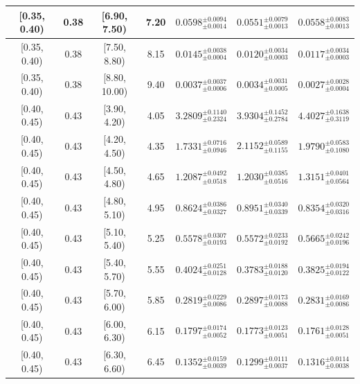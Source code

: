 \begin{longtable}{|c|c|c|c|c|c|c|}
\hline
[0.35, 0.40) & 0.38 & [6.90, 7.50) & 7.20 & $0.0598^{ \pm 0.0094 }_{ \pm 0.0014 }$ & $0.0551^{ \pm 0.0079 }_{ \pm 0.0013 }$ & $0.0558^{ \pm 0.0083 }_{ \pm 0.0013 }$ \\ 
\hline
[0.35, 0.40) & 0.38 & [7.50, 8.80) & 8.15 & $0.0145^{ \pm 0.0038 }_{ \pm 0.0004 }$ & $0.0120^{ \pm 0.0034 }_{ \pm 0.0003 }$ & $0.0117^{ \pm 0.0034 }_{ \pm 0.0003 }$ \\ 
\hline
[0.35, 0.40) & 0.38 & [8.80, 10.00) & 9.40 & $0.0037^{ \pm 0.0037 }_{ \pm 0.0006 }$ & $0.0034^{ \pm 0.0031 }_{ \pm 0.0005 }$ & $0.0027^{ \pm 0.0028 }_{ \pm 0.0004 }$ \\ 
\hline
[0.40, 0.45) & 0.43 & [3.90, 4.20) & 4.05 & $3.2809^{ \pm 0.1140 }_{ \pm 0.2324 }$ & $3.9304^{ \pm 0.1452 }_{ \pm 0.2784 }$ & $4.4027^{ \pm 0.1638 }_{ \pm 0.3119 }$ \\ 
\hline
[0.40, 0.45) & 0.43 & [4.20, 4.50) & 4.35 & $1.7331^{ \pm 0.0716 }_{ \pm 0.0946 }$ & $2.1152^{ \pm 0.0589 }_{ \pm 0.1155 }$ & $1.9790^{ \pm 0.0583 }_{ \pm 0.1080 }$ \\ 
\hline
[0.40, 0.45) & 0.43 & [4.50, 4.80) & 4.65 & $1.2087^{ \pm 0.0492 }_{ \pm 0.0518 }$ & $1.2030^{ \pm 0.0385 }_{ \pm 0.0516 }$ & $1.3151^{ \pm 0.0401 }_{ \pm 0.0564 }$ \\ 
\hline
[0.40, 0.45) & 0.43 & [4.80, 5.10) & 4.95 & $0.8624^{ \pm 0.0386 }_{ \pm 0.0327 }$ & $0.8951^{ \pm 0.0340 }_{ \pm 0.0339 }$ & $0.8354^{ \pm 0.0320 }_{ \pm 0.0316 }$ \\ 
\hline
[0.40, 0.45) & 0.43 & [5.10, 5.40) & 5.25 & $0.5578^{ \pm 0.0307 }_{ \pm 0.0193 }$ & $0.5572^{ \pm 0.0233 }_{ \pm 0.0192 }$ & $0.5665^{ \pm 0.0242 }_{ \pm 0.0196 }$ \\ 
\hline
[0.40, 0.45) & 0.43 & [5.40, 5.70) & 5.55 & $0.4024^{ \pm 0.0251 }_{ \pm 0.0128 }$ & $0.3783^{ \pm 0.0188 }_{ \pm 0.0120 }$ & $0.3825^{ \pm 0.0194 }_{ \pm 0.0122 }$ \\ 
\hline
[0.40, 0.45) & 0.43 & [5.70, 6.00) & 5.85 & $0.2819^{ \pm 0.0229 }_{ \pm 0.0086 }$ & $0.2897^{ \pm 0.0173 }_{ \pm 0.0088 }$ & $0.2831^{ \pm 0.0169 }_{ \pm 0.0086 }$ \\ 
\hline
[0.40, 0.45) & 0.43 & [6.00, 6.30) & 6.15 & $0.1797^{ \pm 0.0174 }_{ \pm 0.0052 }$ & $0.1773^{ \pm 0.0123 }_{ \pm 0.0051 }$ & $0.1761^{ \pm 0.0128 }_{ \pm 0.0051 }$ \\ 
\hline
[0.40, 0.45) & 0.43 & [6.30, 6.60) & 6.45 & $0.1352^{ \pm 0.0159 }_{ \pm 0.0039 }$ & $0.1299^{ \pm 0.0111 }_{ \pm 0.0037 }$ & $0.1316^{ \pm 0.0114 }_{ \pm 0.0038 }$ \\ 
\hline

\end{longtable}
